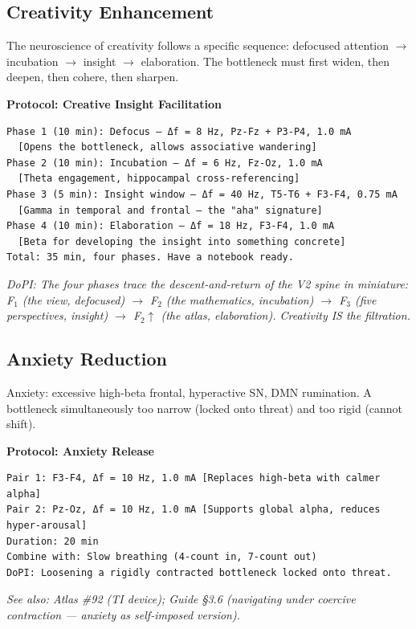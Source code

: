 \subsection*{Creativity Enhancement}


The neuroscience of creativity follows a specific sequence: defocused attention $\rightarrow$ incubation $\rightarrow$ insight $\rightarrow$ elaboration. The bottleneck must first widen, then deepen, then cohere, then sharpen.


\textbf{Protocol: Creative Insight Facilitation}

\begin{verbatim}
Phase 1 (10 min): Defocus — Δf = 8 Hz, Pz-Fz + P3-P4, 1.0 mA
  [Opens the bottleneck, allows associative wandering]
Phase 2 (10 min): Incubation — Δf = 6 Hz, Fz-Oz, 1.0 mA  
  [Theta engagement, hippocampal cross-referencing]
Phase 3 (5 min): Insight window — Δf = 40 Hz, T5-T6 + F3-F4, 0.75 mA
  [Gamma in temporal and frontal — the "aha" signature]
Phase 4 (10 min): Elaboration — Δf = 18 Hz, F3-F4, 1.0 mA
  [Beta for developing the insight into something concrete]
Total: 35 min, four phases. Have a notebook ready.
\end{verbatim}


\textit{DoPI: The four phases trace the descent-and-return of the V2 spine in miniature: F$_1$ (the view, defocused) $\rightarrow$ F$_2$ (the mathematics, incubation) $\rightarrow$ F$_3$ (five perspectives, insight) $\rightarrow$ F$_2$$\uparrow$ (the atlas, elaboration). Creativity IS the filtration.}


\subsection*{Anxiety Reduction}


Anxiety: excessive high-beta frontal, hyperactive SN, DMN rumination. A bottleneck simultaneously too narrow (locked onto threat) and too rigid (cannot shift).


\textbf{Protocol: Anxiety Release}

\begin{verbatim}
Pair 1: F3-F4, Δf = 10 Hz, 1.0 mA [Replaces high-beta with calmer alpha]
Pair 2: Pz-Oz, Δf = 10 Hz, 1.0 mA [Supports global alpha, reduces hyper-arousal]
Duration: 20 min
Combine with: Slow breathing (4-count in, 7-count out)
DoPI: Loosening a rigidly contracted bottleneck locked onto threat.
\end{verbatim}


\textit{See also: Atlas \#92 (TI device); Guide §3.6 (navigating under coercive contraction — anxiety as self-imposed version).}



